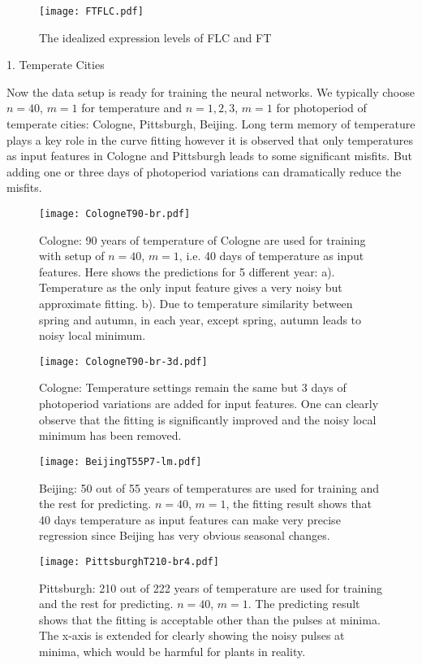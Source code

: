 \documentclass[paper=a4, fontsize=12pt]{scrartcl}	%
\numberwithin{equation}{section}					%
\numberwithin{figure}{section}					%
\numberwithin{table}{section}					%
\begin{document}
\begin{figure}[H]
\centering
\texttt{[image: FTFLC.pdf]}
\caption{The idealized expression levels of FLC and FT}
\label{fig:ftflc}
\end{figure}

1. Temperate Cities

Now the data setup is ready for training the neural networks. We typically choose $n=40$, $m=1$ for temperature and $n=1, 2, 3$, $m=1$ for photoperiod of temperate cities: Cologne, Pittsburgh, Beijing. Long term memory of temperature plays a key role in the curve fitting however it is observed that only temperatures as input features in Cologne and Pittsburgh leads to some significant misfits. But adding one or three days of photoperiod variations can dramatically reduce the misfits. 

\begin{figure}[H]
\centering
\texttt{[image: CologneT90-br.pdf]}
\caption{Cologne: 90 years of temperature of Cologne are used for training with setup of $n=40$, $m=1$, i.e. 40 days of temperature as input features. Here shows the predictions for 5 different year: a). Temperature as the only input feature gives a very noisy but approximate fitting. b). Due to temperature similarity between spring and autumn, in each year, except spring, autumn leads to noisy local minimum.}
\label{fig:cologneT}
\end{figure}
\begin{figure}[H]
\centering
\texttt{[image: CologneT90-br-3d.pdf]}
\caption{Cologne: Temperature settings remain the same but 3 days of photoperiod variations are added for input features. One can clearly observe that the fitting is significantly improved and the noisy local minimum has been removed. }
\label{fig:cologneTD}
\end{figure}

\begin{figure}[H]
\centering
\texttt{[image: BeijingT55P7-lm.pdf]}
\caption{Beijing: 50 out of 55 years of temperatures are used for training and the rest for predicting. $n=40$, $m=1$, the fitting result shows that 40 days temperature as input features can make very precise regression since Beijing has very obvious seasonal changes.}
\label{fig:beijing}
\end{figure}

\begin{figure}[H]
\centering
\texttt{[image: PittsburghT210-br4.pdf]}
\caption{Pittsburgh: 210 out of 222 years of temperature are used for training and the rest for predicting. $n=40$, $m=1$. The predicting result shows that the fitting is acceptable other than the pulses at minima. The x-axis is extended for clearly showing the noisy pulses at minima, which would be harmful for plants in reality.}
\label{fig:pittsT}
\end{figure}
\end{document}
